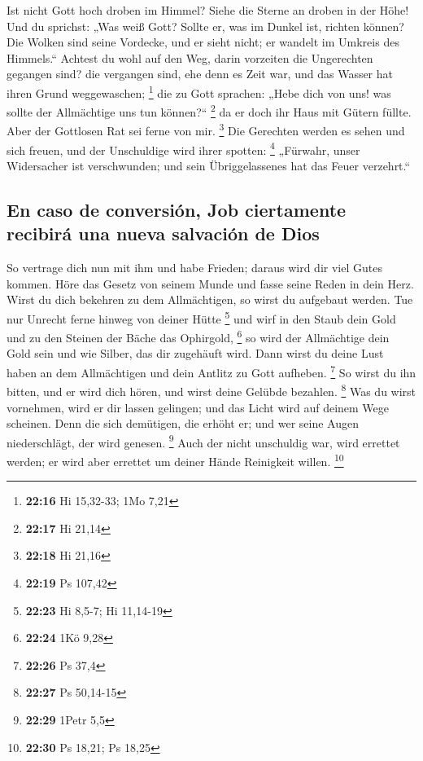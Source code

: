  Ist nicht Gott hoch droben im Himmel? Siehe die Sterne
an droben in der Höhe!  Und du sprichst: „Was weiß Gott?
Sollte er, was im Dunkel ist, richten können?  Die Wolken
sind seine Vordecke, und er sieht nicht; er wandelt im Umkreis des
Himmels.``  Achtest du wohl auf den Weg, darin vorzeiten
die Ungerechten gegangen sind?  die vergangen sind, ehe
denn es Zeit war, und das Wasser hat ihren Grund weggewaschen;
\footnote{\textbf{22:16} Hi 15,32-33; 1Mo 7,21}  die zu
Gott sprachen: „Hebe dich von uns! was sollte der Allmächtige uns tun
können?{}`` \footnote{\textbf{22:17} Hi 21,14}  da er
doch ihr Haus mit Gütern füllte. Aber der Gottlosen Rat sei ferne von
mir. \footnote{\textbf{22:18} Hi 21,16}  Die Gerechten
werden es sehen und sich freuen, und der Unschuldige wird ihrer spotten:
\footnote{\textbf{22:19} Ps 107,42}  „Fürwahr, unser
Widersacher ist verschwunden; und sein Übriggelassenes hat das Feuer
verzehrt.``

\hypertarget{en-caso-de-conversiuxf3n-job-ciertamente-recibiruxe1-una-nueva-salvaciuxf3n-de-dios}{%
\subsection{En caso de conversión, Job ciertamente recibirá una nueva
salvación de
Dios}\label{en-caso-de-conversiuxf3n-job-ciertamente-recibiruxe1-una-nueva-salvaciuxf3n-de-dios}}

 So vertrage dich nun mit ihm und habe Frieden; daraus
wird dir viel Gutes kommen.  Höre das Gesetz von seinem
Munde und fasse seine Reden in dein Herz.  Wirst du dich
bekehren zu dem Allmächtigen, so wirst du aufgebaut werden. Tue nur
Unrecht ferne hinweg von deiner Hütte \footnote{\textbf{22:23} Hi 8,5-7;
  Hi 11,14-19}  und wirf in den Staub dein Gold und zu
den Steinen der Bäche das Ophirgold, \footnote{\textbf{22:24} 1Kö 9,28}
 so wird der Allmächtige dein Gold sein und wie Silber,
das dir zugehäuft wird.  Dann wirst du deine Lust haben
an dem Allmächtigen und dein Antlitz zu Gott aufheben. \footnote{\textbf{22:26}
  Ps 37,4}  So wirst du ihn bitten, und er wird dich
hören, und wirst deine Gelübde bezahlen. \footnote{\textbf{22:27} Ps
  50,14-15}  Was du wirst vornehmen, wird er dir lassen
gelingen; und das Licht wird auf deinem Wege scheinen. 
Denn die sich demütigen, die erhöht er; und wer seine Augen
niederschlägt, der wird genesen. \footnote{\textbf{22:29} 1Petr 5,5}
 Auch der nicht unschuldig war, wird errettet werden; er
wird aber errettet um deiner Hände Reinigkeit willen. \footnote{\textbf{22:30}
  Ps 18,21; Ps 18,25}

